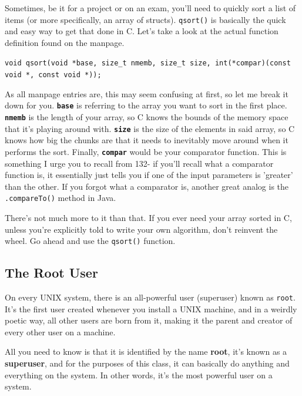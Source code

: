\documentclass[english, 10pt]{article}
\begin{document}
Sometimes, be it for a project or on an exam, you'll need to quickly sort a list of items (or more specifically, an array of structs). \texttt{qsort()} is basically the quick and easy way to get that done in C. Let's take a look at the actual function definition found on the manpage.\newline

\texttt{void qsort(void *base, size\_t nmemb, size\_t size, int(*compar)(const void *, const void *));}\newline

As all manpage entries are, this may seem confusing at first, so let me break it down for you. \textbf{\texttt{base}} is referring to the array you want to sort in the first place. \textbf{\texttt{nmemb}} is the length of your array, so C knows the bounds of the memory space that it's playing around with. \textbf{\texttt{size}} is the size of the elements in said array, so C knows how big the chunks are that it needs to inevitably move around when it performs the sort. Finally, \textbf{\texttt{compar}} would be your comparator function. This is something I urge you to recall from 132- if you'll recall what a comparator function is, it essentially just tells you if one of the input parameters is 'greater' than the other. If you forgot what a comparator is, another great analog is the \texttt{.compareTo()} method in Java.\newline

There's not much more to it than that. If you ever need your array sorted in C, unless you're explicitly told to write your own algorithm, don't reinvent the wheel. Go ahead and use the \texttt{qsort()} function.

\subsection{The Root User}

On every UNIX system, there is an all-powerful user (superuser) known as \texttt{root}. It's the first user created whenever you install a UNIX machine, and in a weirdly poetic way, all other users are born from it, making it the parent and creator of every other user on a machine.\newline

All you need to know is that it is identified by the name \textbf{root}, it's known as a \textbf{superuser}, and for the purposes of this class, it can basically do anything and everything on the system. In other words, it's the most powerful user on a system.
\end{document}
